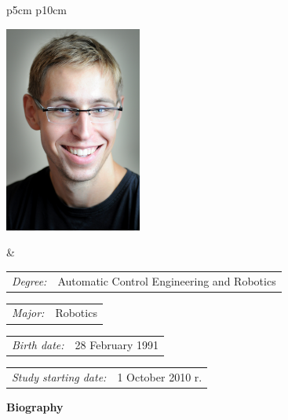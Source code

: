     \vspace*{1\baselineskip}
    \begin{tabular}{p{5cm} p{10cm}}
    \begin{minipage}{5cm}
    \center
    \includegraphics[width=4.5cm]{figs/ja}
    \end{minipage}
    &
    \begin{minipage}{12cm}
\par\noindent\vspace{1\baselineskip}
    \begin{flushleft}
    \par\noindent\vspace{1\baselineskip}
    \begin{tabular}[h]{l l}
    {\normalsize\it Degree:} & Automatic Control Engineering and Robotics
    \end{tabular}
    \par\noindent\vspace{1\baselineskip}
    \begin{tabular}[h]{l l}
    {\normalsize\it Major:} & Robotics
    \end{tabular}
    \par\noindent\vspace{1\baselineskip}
    \begin{tabular}[h]{l l}
    {\normalsize\it Birth date:} & {\normalsize 28 February 1991}
    \end{tabular}
    \par\noindent\vspace{1\baselineskip}
    \begin{tabular}[h]{l l}
    {\normalsize\it Study starting date:} & {\normalsize 1 October 2010 r.}
    \end{tabular}
    \par\noindent\vspace{1\baselineskip}
    \end{flushleft}
    \end{minipage}
    \end{tabular}
    \vspace*{1\baselineskip}
    \begin{center}
	{\large\bfseries Biography}\par\bigskip
    \end{center}
	
